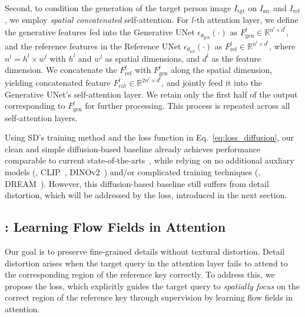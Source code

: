 Second, to condition the generation of the target person image $I_{\text{tgt}}$ on $I_{\text{src}}$ and $I_{\text{ref}}$, we employ \textit{spatial concatenated} self-attention.
For $l$-th attention layer, we define the generative features fed into the Generative UNet $\epsilon_{\theta_{\text{gen}}}(\cdot)$ as $F_{\text{gen}}^{l} \in \mathbb{R}^{n^{l} \times d^{l}}$, and the reference features in the Reference UNet $\epsilon_{\theta_{\text{ref}}}(\cdot)$ as $F_{\text{ref}}^{l} \in \mathbb{R}^{n^{l} \times d^{l}}$, where $n^{l} = h^{l} \times w^{l}$ with $h^{l}$ and $w^{l}$ as spatial dimensions, and $d^{l}$ as the feature dimension.
We concatenate the $F_{\text{ref}}^{l}$ with $F_{\text{gen}}^{l}$ along the spatial dimension, yielding concatenated feature $F_{\text{cat}}^{l} \in \mathbb{R}^{2n^{l} \times d^{l}}$, and jointly feed it into the Generative UNet's self-attention layer.
We retain only the first half of the output corresponding to $F_{\text{gen}}^{l}$ for further processing.
This process is repeated across all self-attention layers.

Using SD's training method and the loss function in Eq.~\ref{eq:loss_diffusion}, our clean and simple diffusion-based baseline already achieves performance comparable to current state-of-the-arts~\citep{kim2024stableviton, choi2024improving, chong2024catvton, wan2024improving, bhunia2023person, han2023controllable, lu2024coarse, pham2024cross}, while relying on no additional auxliary models (\eg, CLIP~\citep{radford2021learning}, DINOv2~\citep{oquab2023dinov2}) and/or complicated training techniques (\eg, DREAM~\citep{zhou2024dream}).
However, this diffusion-based baseline still suffers from detail distortion, which will be addressed by the \leffa{} loss, introduced in the next section.


\subsection{\textbf{\leffa{}}: Learning Flow Fields in Attention}
\label{leffa:sec:leffa}

Our goal is to preserve fine-grained details without textural distortion.
Detail distortion arises when the target query in the attention layer fails to attend to the corresponding region of the reference key correctly.
To address this, we propose the \leffa{} loss, which explicitly guides the target query to \textit{spatially focus} on the correct region of the reference key through supervision by learning flow fields in attention.

